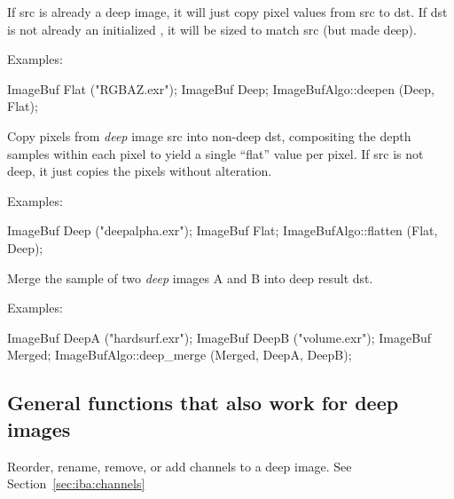 If {\cf src} is already a deep image, it will just copy pixel values from
{\cf src} to {\cf dst}. If {\cf dst} is not already an initialized
\ImageBuf, it will be sized to match {\cf src} (but made deep).

\smallskip
\noindent Examples:
\begin{code}
    ImageBuf Flat ("RGBAZ.exr");
    ImageBuf Deep;
    ImageBufAlgo::deepen (Deep, Flat);
\end{code}
\apiend

  
Copy pixels from \emph{deep} image {\cf src} into non-deep {\cf dst},
compositing the depth samples within each pixel to yield a single ``flat''
value per pixel. If {\cf src} is not deep, it just copies the pixels without
alteration.

\smallskip
\noindent Examples:
\begin{code}
    ImageBuf Deep ("deepalpha.exr");
    ImageBuf Flat;
    ImageBufAlgo::flatten (Flat, Deep);
\end{code}
\apiend

  
Merge the sample of two \emph{deep} images {\cf A} and {\cf B} into deep
result {\cf dst}.

\smallskip
\noindent Examples:
\begin{code}
    ImageBuf DeepA ("hardsurf.exr");
    ImageBuf DeepB ("volume.exr");
    ImageBuf Merged;
    ImageBufAlgo::deep_merge (Merged, DeepA, DeepB);
\end{code}
\apiend

\subsection{General functions that also work for deep images}

Reorder, rename, remove, or add channels to a deep image.
See Section~\ref{sec:iba:channels}
\apiend

